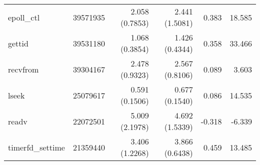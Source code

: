 \begin{tabular}{>{\ttfamily}lrrrrr}
                     epoll\_ctl &    39571935 &           2.058 (0.7853) &           2.441 (1.5081) &           0.383 &       18.585 \\
                         gettid &    39531180 &           1.068 (0.3854) &           1.426 (0.4344) &           0.358 &       33.466 \\
                       recvfrom &    39304167 &           2.478 (0.9323) &           2.567 (0.8106) &           0.089 &        3.603 \\
                          lseek &    25079617 &           0.591 (0.1506) &           0.677 (0.1540) &           0.086 &       14.535 \\
                          readv &    22072501 &           5.009 (2.1978) &           4.692 (1.5339) &          -0.318 &       -6.339 \\
               timerfd\_settime &    21359440 &           3.406 (1.2268) &           3.866 (0.6438) &           0.459 &       13.485 \\
\bottomrule
\end{tabular}
